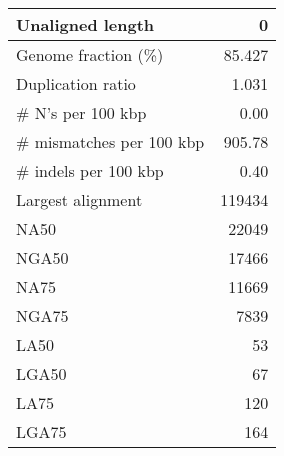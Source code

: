 \documentclass[12pt,a4paper]{article}
\begin{document}
\begin{table}[ht]
\begin{center}
\begin{tabular}{|l*{1}{|r}|}
Unaligned length & 0 \\ \hline
Genome fraction (\%) & 85.427 \\ \hline
Duplication ratio & 1.031 \\ \hline
\# N's per 100 kbp & 0.00 \\ \hline
\# mismatches per 100 kbp & 905.78 \\ \hline
\# indels per 100 kbp & 0.40 \\ \hline
Largest alignment & 119434 \\ \hline
NA50 & 22049 \\ \hline
NGA50 & 17466 \\ \hline
NA75 & 11669 \\ \hline
NGA75 & 7839 \\ \hline
LA50 & 53 \\ \hline
LGA50 & 67 \\ \hline
LA75 & 120 \\ \hline
LGA75 & 164 \\ \hline
\end{tabular}
\end{center}
\end{table}
\end{document}
